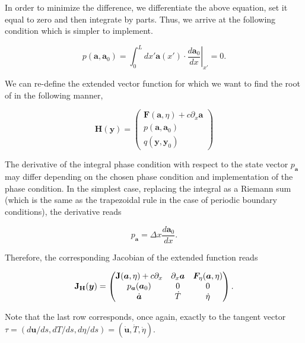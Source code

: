 In order to minimize the difference, we differentiate the above equation, set it equal to zero and 
then integrate by parts. Thus, we arrive at the following condition which is simpler to
implement.

\begin{equation}
    p(\bm{a}, \bm{a}_0) = \int_0^L dx' \bm{a}(x') \cdot \left. \frac{d\bm{a}_0}{dx}\right\vert_{x'} = 0.
\end{equation}

We can re-define the extended vector function for which we want to find 
the root of in the following manner,

\begin{equation}
    \bm{H(\bm{y})} = \begin{pmatrix}
      \bm{F}(\bm{a}, \eta) + c\partial_x\bm{a} \\
    p(\bm{a}, \bm{a}_0) \\
    q(\bm{y}, \bm{y}_0)
    \end{pmatrix}
\end{equation}


The derivative of the integral phase condition with respect to the state vector $p_{\bm{a}}$ may differ depending on the chosen 
phase condition and implementation of the phase condition. In the simplest case, 
replacing the integral as a Riemann sum (which is the same as the trapezoidal rule in the case of periodic boundary conditions), the derivative reads

\begin{equation}
    p_{\bm{a}} = \Delta x \dfrac{d\bm{a}_0}{dx}.
\end{equation}

Therefore, the corresponding Jacobian of the extended function reads

\begin{equation}
    \mathbf{J_H}(\bm{y}) = \begin{pmatrix}
        \mathbf{J}(\bm{a}, \eta) + c\partial_x & \partial_x\bm{a} &  \bm{F}_\eta(\bm{a}, \eta)\\
        p_{\bm{a}}(\bm{a}_0) & 0 & 0 \\
        \dot{\bm{a}} & \dot{T} & \dot{\eta} \\
    \end{pmatrix}.
\end{equation}

Note that the last row corresponds, once again, exactly to the tangent vector
$\tau = (d\bm{u}/ds, dT/ds, d\eta/ds) = (\dot{\bm{u}}, \dot{T}, \dot{\eta})$.


